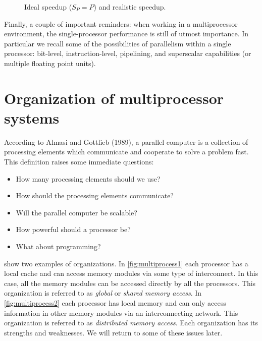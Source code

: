 \begin{figure}
  \centering
  \caption{Ideal speedup ($S_P = P$) and realistic speedup.}
  \label{fig:scalability}
\end{figure}

Finally, a couple of important reminders: when working in a multiprocessor
environment, the single-processor performance is still of utmost importance. In
particular we recall some of the possibilities of parallelism within a single
processor: bit-level, instruction-level, pipelining, and superscalar
capabilities (or multiple floating point units).

\section{Organization of multiprocessor systems}

According to Almasi and Gottlieb (1989), a parallel computer is a collection of
processing elements which communicate and cooperate to solve a problem fast.
This definition raises some immediate questions:
\begin{itemize}
\item How many processing elements should we use?
\item How should the processing elements communicate?
\item Will the parallel computer be scalable?
\item How powerful should a processor be?
\item What about programming?
\end{itemize}

 show two examples of
organizations. In \autoref{fig:multiprocess1} each processor has a local cache
and can access memory modules via some type of interconnect. In this case, all
the memory modules can be accessed directly by all the processors. This
organization is referred to as \emph{global} or \emph{shared memory access}. In
\autoref{fig:multiprocess2} each processor has local memory and can only access
information in other memory modules via an interconnecting network. This
organization is referred to as \emph{distributed memory access}. Each
organization has its strengths and weaknesses. We will return to some of these
issues later.


